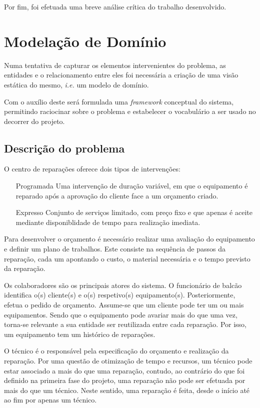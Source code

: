 \documentclass[a4paper,12pt]{scrreprt}
\begin{document}
Por fim, foi efetuada uma breve análise crítica do trabalho desenvolvido.


\chapter{Modelação de Domínio} \label{modelacao_dominio}
Numa tentativa de capturar os elementos intervenientes do problema, as entidades e o relacionamento entre eles foi necessária
a criação de uma visão estática do mesmo, \textit{i.e.} um modelo de domínio. 

Com o auxílio deste será formulada uma \textit{framework} conceptual do sistema, permitindo raciocinar sobre o problema e estabelecer o 
vocabulário a ser usado no decorrer do projeto.

\section{Descrição do problema}
O centro de reparações oferece dois tipos de intervenções:
\begin{itemize}
    \item[Programada]{Uma intervenção de duração variável, em que o equipamento é reparado após a aprovação do cliente face a um orçamento criado.}
    \item[Expresso]{Conjunto de serviços limitado, com preço fixo e 
                    que apenas é aceite mediante disponiblidade de tempo para realização imediata.
                   }
\end{itemize}

Para desenvolver o orçamento é necessário realizar uma avaliação do equipamento e definir um plano de trabalhos. 
Este consiste na sequência de passos da reparação, cada um apontando o custo, o material necessária e o tempo 
previsto da reparação.

Os colaboradores são os principais atores do sistema. 
O funcionário de balcão identifica o(s) cliente(s) e o(s) respetivo(s) equipamento(s). Posteriormente, efetua o pedido de orçamento.
Assume-se que um cliente pode ter um ou mais equipamentos.
Sendo que o equipamento pode avariar mais do que uma vez, torna-se relevante a sua entidade ser reutilizada entre cada reparação.
Por isso, um equipamento tem um histórico de reparações.

O técnico é o responsável pela especificação do orçamento e realização da reparação.
Por uma questão de otimização de tempo e recursos, um técnico pode estar associado a mais do que uma reparação, contudo, ao
contrário do que foi definido na primeira fase do projeto, uma reparação não pode ser efetuada por mais do que um técnico.
Neste sentido, uma reparação é feita, desde o início até ao fim por apenas um técnico. 
\end{document}
